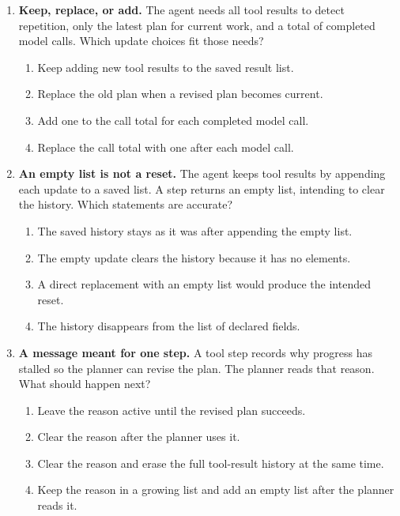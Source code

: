 \begin{enumerate}[start=11,itemsep=0.7\baselineskip]
\item\label{exercise:14} \begin{minipage}[t]{\linewidth}
\textbf{Keep, replace, or add.} The agent needs all tool results to detect repetition, only the latest plan for current work, and a total of completed model calls. Which update choices fit those needs?
\begin{enumerate}[label=\textnormal{(\Alph*)},leftmargin=*,itemsep=0pt]
\item Keep adding new tool results to the saved result list.
\item Replace the old plan when a revised plan becomes current.
\item Add one to the call total for each completed model call.
\item Replace the call total with one after each model call.
\end{enumerate}
\end{minipage}

\item\label{exercise:15} \begin{minipage}[t]{\linewidth}
\textbf{An empty list is not a reset.} The agent keeps tool results by appending each update to a saved list. A step returns an empty list, intending to clear the history. Which statements are accurate?
\begin{enumerate}[label=\textnormal{(\Alph*)},leftmargin=*,itemsep=0pt]
\item The saved history stays as it was after appending the empty list.
\item The empty update clears the history because it has no elements.
\item A direct replacement with an empty list would produce the intended reset.
\item The history disappears from the list of declared fields.
\end{enumerate}
\end{minipage}

\item\label{exercise:16} \begin{minipage}[t]{\linewidth}
\textbf{A message meant for one step.} A tool step records why progress has stalled so the planner can revise the plan. The planner reads that reason. What should happen next?
\begin{enumerate}[label=\textnormal{(\Alph*)},leftmargin=*,itemsep=0pt]
\item Leave the reason active until the revised plan succeeds.
\item Clear the reason after the planner uses it.
\item Clear the reason and erase the full tool-result history at the same time.
\item Keep the reason in a growing list and add an empty list after the planner reads it.
\end{enumerate}
\end{minipage}


\end{enumerate}

